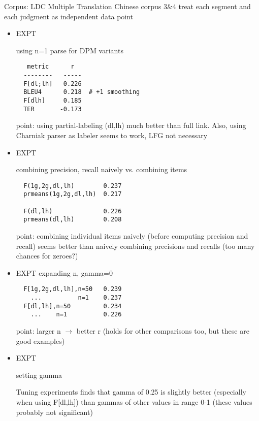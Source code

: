 \documentclass{kluwer}    %
\begin{document}
\begin{article}
Corpus: LDC Multiple Translation Chinese corpus 3\&4 treat each
segment and each judgment as independent data point

\begin{itemize}
\item EXPT

  using n=1 parse for DPM variants

\begin{verbatim}
   metric      r
  --------   -----
  F[dl;lh]   0.226
  BLEU4      0.218  # +1 smoothing
  F[dlh]     0.185
  TER       -0.173
\end{verbatim}

  point: using partial-labeling (dl,lh) much better than full
  link. Also, using Charniak parser as labeler seems to work, LFG not
  necessary

\item EXPT 

  combining precision, recall naively vs. combining items

\begin{verbatim}
  F(1g,2g,dl,lh)        0.237
  prmeans(1g,2g,dl,lh)  0.217

  F(dl,lh)              0.226
  prmeans(dl,lh)        0.208
\end{verbatim}

  point: combining individual items naively (before computing
  precision and recall) seems better than naively combining precisions
  and recalls (too many chances for zeroes?)

\item EXPT
  expanding n, gamma=0

\begin{verbatim}
  F[1g,2g,dl,lh],n=50   0.239
    ...          n=1    0.237
  F[dl,lh],n=50         0.234
    ...    n=1          0.226
\end{verbatim}
  point: larger n $\to$ better r
  (holds for other comparisons too, but these are good examples)

\item  EXPT

  setting gamma

  Tuning experiments finds that gamma of 0.25 is slightly better
  (especially when using F[dl,lh]) than gammas of other values in
  range 0-1 (these values probably not significant)


\end{itemize}





\end{article}
\end{document}
